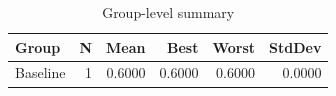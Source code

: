 \begin{table}[htbp]
\centering
\caption{Group-level summary}
\label{tab:group-summary}
\begin{tabular}{lrrrrr}
\toprule
\textbf{Group} & \textbf{N} & \textbf{Mean} & \textbf{Best} & \textbf{Worst} & \textbf{StdDev} \\
\midrule
Baseline & 1 & 0.6000 & 0.6000 & 0.6000 & 0.0000 \\
\bottomrule
\end{tabular}
\end{table}
